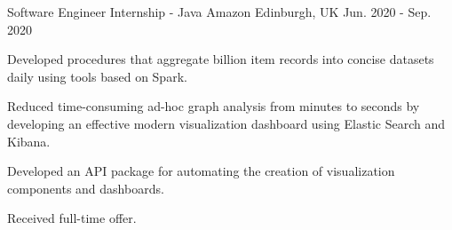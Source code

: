 \begin{cventries}
  \cventry
    {Software Engineer Internship - Java} %
    {Amazon} %
    {Edinburgh, UK} %
    {Jun. 2020 - Sep. 2020} %
    {
      \begin{cvitems} %
        \item {Developed procedures that aggregate  billion item records into concise datasets daily using tools based on Spark.}
        \item {Reduced time-consuming ad-hoc graph analysis from minutes to seconds by developing an effective modern visualization dashboard using Elastic Search and Kibana.}
        \item {Developed an API package for automating the creation of visualization components and dashboards.}
        \item {Received full-time offer.}
      \end{cvitems}
    }


\end{cventries}
